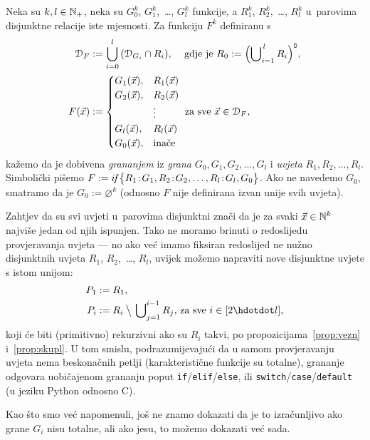 \begin{definicija}[{name=[grananje]}]\label{def:gr}
Neka su $k,l\in{\mathbb N}_+$, neka su $G_0^k$, $G_1^k$,~\ldots, $G_l^k$ funkcije, a $R_1^k$, $R_2^k$,~\ldots, $R_l^k$ u~parovima disjunktne relacije iste mjesnosti. Za funkciju $F^k$ definiranu s
\begin{align}
	\label{eq:domgran}
    \mathcal D_{F}&:=\bigcup_{i=0}^l\,(\mathcal D_{G_i}\cap R_i)\text{, \quad gdje je }
    R_0:=\Bigl(\bigcup\nolimits_{i=1}^{\,l}R_i\Bigr)\sp{{\scriptscriptstyle\complement}}\text,\\
    F(\vec x)&:=\begin{cases}
    G_1(\vec x),&R_1(\vec x)\\
    G_2(\vec x),&R_2(\vec x)\\
    &\vdots\\
    G_l(\vec x),&R_l(\vec x)\\
    G_0(\vec x),&\text{inače}
    \end{cases}\text{ za sve $\vec x\in\mathcal D_{F}$,}
\end{align}
kažemo da je dobivena \emph{grananjem} iz \emph{grana} $G_0,G_1,G_2,\dotsc,G_l$ i \emph{uvjeta} $R_1,R_2,\dotsc,R_l$. Simbolički pišemo $F:=i\!f\bigl\{R_1\!:\!G_1,R_2\!:\!G_2,\dots,R_l\!:\!G_l,G_0\bigr\}$. Ako ne navedemo $G_0$, smatramo da je $G_0:=\varnothing^k$ (odnosno $F$ nije definirana izvan unije svih uvjeta).
\end{definicija}

Zahtjev da su svi uvjeti u~parovima disjunktni znači da je za svaki $\vec x\in{\mathbb N}^k$ najviše jedan od njih ispunjen. Tako ne moramo brinuti o redoslijedu provjeravanja uvjeta --- no ako već imamo fiksiran redoslijed ne nužno disjunktnih uvjeta $R_1$, $R_2$,~\ldots, $R_l$, uvijek možemo napraviti nove disjunktne uvjete s istom unijom:
\begin{align}
    P_1&:=R_1\text,\\
    P_i&:=R_i\mathbin{\big\backslash}\,\bigcup\nolimits_{j=1}^{i-1}R_j\text{, za sve $i\in[2\dd l]$,}
\end{align}
koji će biti (primitivno) rekurzivni ako su $R_i$ takvi, po propozicijama~\ref{prop:vezn} i~\ref{prop:skupl}. U tom smislu, podrazumijevajući da u samom provjeravanju uvjeta nema beskonačnih petlji (karakteristične funkcije su totalne), grananje odgovara uobičajenom grananju poput \texttt{if}/\texttt{elif}/\texttt{else}, ili \texttt{switch}/\texttt{case}/\texttt{default} (u jeziku Python odnosno C).

Kao što smo već napomenuli, još ne znamo dokazati da je to izračunljivo ako grane $G_i$ nisu totalne, ali ako jesu, to možemo dokazati već sada.

